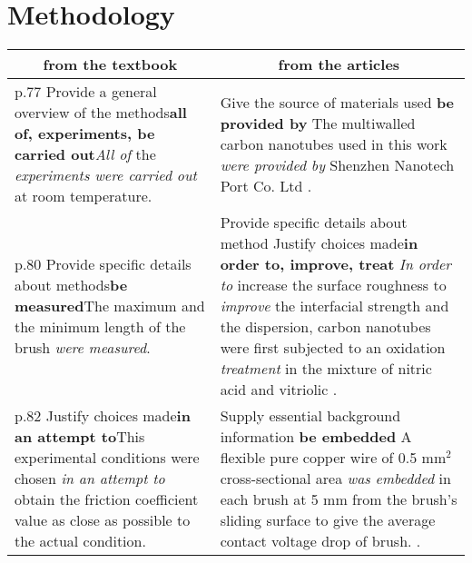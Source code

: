 \documentclass[12pt]{article}
\begin{document}
\section{Methodology}

	\begin{longtable}{|p{}|p{}|}
		\hline
		\multicolumn{1}{|c|}{from the textbook}&\multicolumn{1}{c|}{from the articles}\\
		\hline
		\ding{172} p.77 Provide a general overview of the methods\newline \textbf{all of, experiments, be carried out}\newline \emph{All of} the \emph{experiments were carried out} at room temperature.& \ding{172} Give the source of materials used \newline \textbf{be provided by} \newline The multiwalled carbon nanotubes used in this work \emph{were provided by} Shenzhen Nanotech Port Co. Ltd \cite{intro2}.\\
		\hline
		\ding{174} p.80 Provide specific details about methods\newline \textbf{be measured}\newline The maximum and the minimum length of the brush \emph{were measured}. & \ding{174} Provide specific details about method \ding{175} Justify choices made\newline \textbf{in order to, improve, treat} \newline \emph{In order to} increase the surface roughness to \emph{improve} the interfacial strength and the dispersion, carbon nanotubes were first subjected to an oxidation \emph{treatment} in the mixture of nitric acid and vitriolic \cite{intro2}.\\
		\hline
		\ding{175} p.82 Justify choices made\newline \textbf{in an attempt to}\newline This experimental conditions were chosen \emph{in an attempt to} obtain the friction coefficient value as close as possible to the actual condition.& \ding{173} Supply essential background information \newline \textbf{be embedded} \newline A flexible pure copper wire of 0.5 mm$^2$ cross-sectional area \emph{was embedded} in each brush at 5 mm from the brush's sliding surface to give the average contact voltage drop of brush. \cite{intro2}.\\
		\hline
	\end{longtable}
\end{document}
